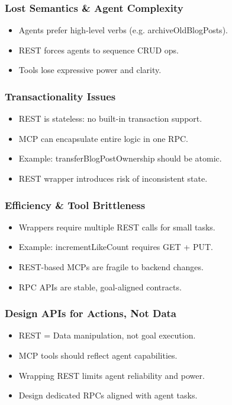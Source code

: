 \begin{frame}[fragile]\frametitle{Lost Semantics \& Agent Complexity}
\begin{itemize}
  \item Agents prefer high-level verbs (e.g. archiveOldBlogPosts).
  \item REST forces agents to sequence CRUD ops.
  \item Tools lose expressive power and clarity.
\end{itemize}
\end{frame}

\begin{frame}[fragile]\frametitle{Transactionality Issues}
\begin{itemize}
  \item REST is stateless: no built-in transaction support.
  \item MCP can encapsulate entire logic in one RPC.
  \item Example: transferBlogPostOwnership should be atomic.
  \item REST wrapper introduces risk of inconsistent state.
\end{itemize}
\end{frame}

\begin{frame}[fragile]\frametitle{Efficiency & Tool Brittleness}
\begin{itemize}
  \item Wrappers require multiple REST calls for small tasks.
  \item Example: incrementLikeCount requires GET + PUT.
  \item REST-based MCPs are fragile to backend changes.
  \item RPC APIs are stable, goal-aligned contracts.
\end{itemize}
\end{frame}

\begin{frame}[fragile]\frametitle{Design APIs for Actions, Not Data}
\begin{itemize}
  \item REST = Data manipulation, not goal execution.
  \item MCP tools should reflect agent capabilities.
  \item Wrapping REST limits agent reliability and power.
  \item Design dedicated RPCs aligned with agent tasks.
\end{itemize}
\end{frame}

